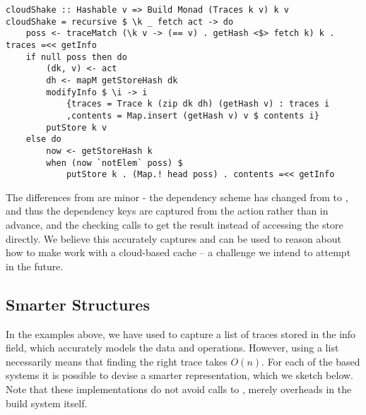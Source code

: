 \begin{verbatim}
cloudShake :: Hashable v => Build Monad (Traces k v) k v
cloudShake = recursive $ \k _ fetch act -> do
    poss <- traceMatch (\k v -> (== v) . getHash <$> fetch k) k . traces =<< getInfo
    if null poss then do
        (dk, v) <- act
        dh <- mapM getStoreHash dk
        modifyInfo $ \i -> i
            {traces = Trace k (zip dk dh) (getHash v) : traces i
            ,contents = Map.insert (getHash v) v $ contents i}
        putStore k v
    else do
        now <- getStoreHash k
        when (now `notElem` poss) $
            putStore k . (Map.! head poss) . contents =<< getInfo
\end{verbatim}

The differences from  are minor - the dependency scheme has changed from  to , and thus the dependency keys  are captured from the action rather than in advance, and the checking calls  to get the result instead of accessing the store directly. We believe this accurately captures and can be used to reason about how to make \Shake work with a cloud-based cache -- a challenge we intend to attempt in the future.

\subsection{Smarter \hs{[Trace]} Structures}\label{sec-smart-traces}

In the examples above, we have used \hs{[Trace]} to capture a list of traces stored in the info field, which accurately models the data and operations. However, using a list necessarily means that finding the right trace takes $O(n)$. For each of the  based systems it is possible to devise a smarter representation, which we sketch below. Note that these implementations do not avoid calls to , merely overheads in the build system itself.

